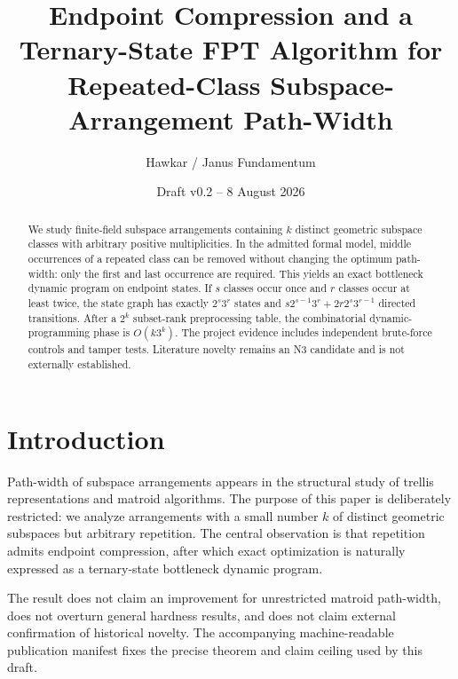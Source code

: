 \documentclass[11pt]{article}
\title{Endpoint Compression and a Ternary-State FPT Algorithm for Repeated-Class Subspace-Arrangement Path-Width}
\author{Hawkar / Janus Fundamentum}
\date{Draft v0.2 -- 8 August 2026}
\begin{document}
\maketitle

\begin{abstract}
We study finite-field subspace arrangements containing $k$ distinct geometric subspace classes with arbitrary positive multiplicities. In the admitted formal model, middle occurrences of a repeated class can be removed without changing the optimum path-width: only the first and last occurrence are required. This yields an exact bottleneck dynamic program on endpoint states. If $s$ classes occur once and $r$ classes occur at least twice, the state graph has exactly $2^s3^r$ states and $s2^{s-1}3^r+2r2^s3^{r-1}$ directed transitions. After a $2^k$ subset-rank preprocessing table, the combinatorial dynamic-programming phase is $O(k3^k)$. The project evidence includes independent brute-force controls and tamper tests. Literature novelty remains an N3 candidate and is not externally established.
\end{abstract}

\section{Introduction}
Path-width of subspace arrangements appears in the structural study of trellis representations and matroid algorithms. The purpose of this paper is deliberately restricted: we analyze arrangements with a small number $k$ of distinct geometric subspaces but arbitrary repetition. The central observation is that repetition admits endpoint compression, after which exact optimization is naturally expressed as a ternary-state bottleneck dynamic program.

The result does not claim an improvement for unrestricted matroid path-width, does not overturn general hardness results, and does not claim external confirmation of historical novelty. The accompanying machine-readable publication manifest fixes the precise theorem and claim ceiling used by this draft.






\end{document}
